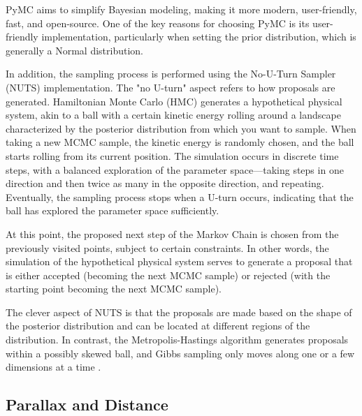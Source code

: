 \documentclass[fleqn,usenatbib,usedcolumn,useAMS]{mnras}
\begin{document}
PyMC aims to simplify Bayesian modeling, making it more modern, user-friendly, fast, and open-source. One of the key reasons for choosing PyMC is its user-friendly implementation, particularly when setting the prior distribution, which is generally a Normal distribution.

In addition, the sampling process is performed using the No-U-Turn Sampler (NUTS) implementation. The "no U-turn" aspect refers to how proposals are generated. Hamiltonian Monte Carlo (HMC) generates a hypothetical physical system, akin to a ball with a certain kinetic energy rolling around a landscape characterized by the posterior distribution from which you want to sample. When taking a new MCMC sample, the kinetic energy is randomly chosen, and the ball starts rolling from its current position. The simulation occurs in discrete time steps, with a balanced exploration of the parameter space—taking steps in one direction and then twice as many in the opposite direction, and repeating. Eventually, the sampling process stops when a U-turn occurs, indicating that the ball has explored the parameter space sufficiently.

At this point, the proposed next step of the Markov Chain is chosen from the previously visited points, subject to certain constraints. In other words, the simulation of the hypothetical physical system serves to generate a proposal that is either accepted (becoming the next MCMC sample) or rejected (with the starting point becoming the next MCMC sample).

The clever aspect of NUTS is that the proposals are made based on the shape of the posterior distribution and can be located at different regions of the distribution. In contrast, the Metropolis-Hastings algorithm generates proposals within a possibly skewed ball, and Gibbs sampling only moves along one or a few dimensions at a time \citep{phan2019composable}.

\subsection{Parallax and Distance}
\end{document}

